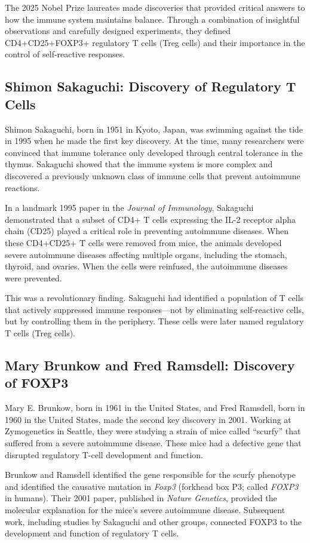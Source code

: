 The 2025 Nobel Prize laureates made discoveries that provided critical answers to how the immune system maintains balance. Through a combination of insightful observations and carefully designed experiments, they defined CD4+CD25+FOXP3+ regulatory T cells (Treg cells) and their importance in the control of self-reactive responses.

\subsection{Shimon Sakaguchi: Discovery of Regulatory T Cells}

Shimon Sakaguchi, born in 1951 in Kyoto, Japan, was swimming against the tide in 1995 when he made the first key discovery. At the time, many researchers were convinced that immune tolerance only developed through central tolerance in the thymus. Sakaguchi showed that the immune system is more complex and discovered a previously unknown class of immune cells that prevent autoimmune reactions.

In a landmark 1995 paper in the \textit{Journal of Immunology}, Sakaguchi demonstrated that a subset of CD4+ T cells expressing the IL-2 receptor alpha chain (CD25) played a critical role in preventing autoimmune diseases. When these CD4+CD25+ T cells were removed from mice, the animals developed severe autoimmune diseases affecting multiple organs, including the stomach, thyroid, and ovaries. When the cells were reinfused, the autoimmune diseases were prevented.

This was a revolutionary finding. Sakaguchi had identified a population of T cells that actively suppressed immune responses---not by eliminating self-reactive cells, but by controlling them in the periphery. These cells were later named regulatory T cells (Treg cells).

\subsection{Mary Brunkow and Fred Ramsdell: Discovery of FOXP3}

Mary E. Brunkow, born in 1961 in the United States, and Fred Ramsdell, born in 1960 in the United States, made the second key discovery in 2001. Working at Zymogenetics in Seattle, they were studying a strain of mice called ``scurfy'' that suffered from a severe autoimmune disease. These mice had a defective gene that disrupted regulatory T-cell development and function.

Brunkow and Ramsdell identified the gene responsible for the scurfy phenotype and identified the causative mutation in \textit{Foxp3} (forkhead box P3; called \textit{FOXP3} in humans). Their 2001 paper, published in \textit{Nature Genetics}, provided the molecular explanation for the mice's severe autoimmune disease. Subsequent work, including studies by Sakaguchi and other groups, connected FOXP3 to the development and function of regulatory T cells.

